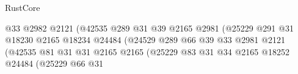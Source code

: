 \begin{lexlean}{RustCore}
\begin{coremodule}
                                                        @33
                                                        @2982
                                                        @2121
                                                        (@42535
                                                          @289
                                                          @31
                                                          @39
                                                          @2165
                                                          @2981
                                                          (@25229
                                                            @291
                                                            @31
                                                            @18230
                                                            @2165
                                                            @18234
                                                            @24484
                                                            (@24529
                                                              @289
                                                              @66
                                                              @39
                                                              @33
                                                              @2981
                                                              @2121
                                                              (@42535
                                                                @81
                                                                @31
                                                                @31
                                                                @2165
                                                                @2165
                                                                (@25229
                                                                  @83
                                                                  @31
                                                                  @34
                                                                  @2165
                                                                  @18252
                                                                  @24484
                                                                  (@25229
                                                                    @66
                                                                    @31

\end{coremodule}
\end{lexlean}
